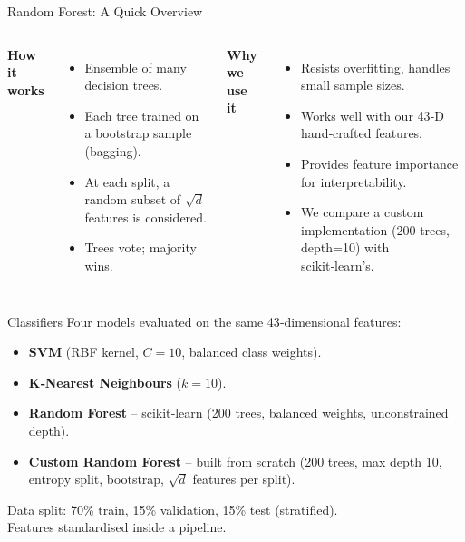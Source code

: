 \documentclass[compress,aspectratio=169]{beamer}
\begin{document}
\begin{frame}{Random Forest: A Quick Overview}
  \vspace{0.3cm}
  \begin{columns}[t]
    \textbf{How it works}
    \begin{itemize}
      \item Ensemble of many decision trees.
      \item Each tree trained on a \alert{bootstrap sample} (bagging).
      \item At each split, a \alert{random subset} of $\sqrt{d}$ features is considered.
      \item Trees vote; majority wins.
    \end{itemize}
    \textbf{Why we use it}
    \begin{itemize}
      \item Resists overfitting, handles small sample sizes.
      \item Works well with our 43‑D hand‑crafted features.
      \item Provides \alert{feature importance} for interpretability.
      \item We compare a \alert{custom implementation} (200 trees, depth=10) with scikit‑learn's.
    \end{itemize}
  \end{columns}
\end{frame}

\begin{frame}{Classifiers}
  Four models evaluated on the same 43‑dimensional features:
  \begin{itemize}
    \item \textbf{SVM} (RBF kernel, $C=10$, balanced class weights).
    \item \textbf{K‑Nearest Neighbours} ($k=10$).
    \item \textbf{Random Forest} – scikit‑learn (200 trees, balanced weights, unconstrained depth).
    \item \textbf{Custom Random Forest} – built from scratch (200 trees, max depth 10, entropy split, bootstrap, $\sqrt{d}$ features per split).
  \end{itemize}
  \vspace{0.3cm}
  \small
  Data split: 70\% train, 15\% validation, 15\% test (stratified).\\
  Features standardised inside a pipeline.
\end{frame}

\end{document}
